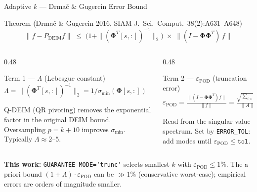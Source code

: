 \documentclass[aspectratio=169, 11pt]{beamer}
\newcommand{\epod}{\varepsilon_{\mathrm{POD}}}
\newcommand{\Phimat}{\boldsymbol{\Phi}}
\begin{document}
\begin{frame}{Adaptive $k$ — Drmač \& Gugercin Error Bound}

\vspace{-0.2em}
\begingroup
{}
\begin{block}{Theorem \normalfont\footnotesize(Drmač \& Gugercin 2016, SIAM J.\ Sci.\ Comput.\ 38(2):A631–A648)}
\vspace{-0.4em}
\[
\|f - P_{\mathrm{DEIM}} f\|
\;\leq\;
\bigl(1 + \|(\Phimat^T[s,:])^{-1}\|_2\bigr)
\;\times\;
\|(I - \Phimat\Phimat^T)\,f\|
\]
\vspace{-0.6em}
\end{block}
\endgroup

\vspace{0.15em}
\begin{columns}[T]
\begin{column}{0.48\textwidth}
  \begin{block}{Term 1 — $\Lambda$ (Lebesgue constant)}
    \scriptsize
    $\Lambda = \|(\Phimat^T[s,:])^{-1}\|_2 = 1/\sigma_{\min}(\Phimat[s,:])$

    \smallskip
    Q-DEIM (QR pivoting) removes the exponential factor in the original DEIM bound.
    Oversampling $p = k+10$ improves $\sigma_{\min}$. Typically $\Lambda \approx 2$–$5$.
  \end{block}
\end{column}
\begin{column}{0.48\textwidth}
  \begin{block}{Term 2 — $\epod$ (truncation error)}
    \scriptsize
    $\displaystyle
      \epod = \frac{\|(I-\Phimat\Phimat^T)f\|}{\|f\|}
             = \frac{\sqrt{\sum_{i>k}\sigma_i^2}}{\|A\|_F}$

    \smallskip
    Read from the singular value spectrum.
    Set by \texttt{ERROR\_TOL}: add modes until $\epod \leq \texttt{tol}$.
  \end{block}
\end{column}
\end{columns}

\vspace{0.15em}
{\small\textcolor{camber}{\textbf{This work:}}
\texttt{GUARANTEE\_MODE=`trunc'} selects smallest $k$ with $\epod \leq 1\%$.
The a priori bound $(1\!+\!\Lambda)\cdot\epod$ can be $\gg 1\%$ (conservative worst-case);
empirical errors are orders of magnitude smaller.}

\end{frame}
\end{document}
